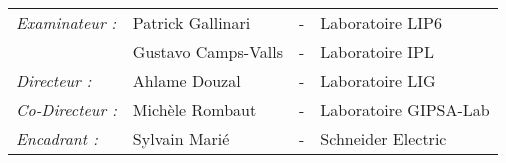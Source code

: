 \begin{titlepage}
\begin{center}
\begin{tabular}{llcl}
      \textit{Examinateur :}	& Patrick Gallinari	& - & Laboratoire LIP6\\
							    & Gustavo Camps-Valls & - & Laboratoire IPL\\
      \textit{Directeur :}	    & Ahlame Douzal & - & Laboratoire LIG\\
      \textit{Co-Directeur :}	& Michèle Rombaut	& - & Laboratoire GIPSA-Lab\\
      \textit{Encadrant :}	    & Sylvain Mari\'{e}	& - & Schneider Electric\\
\end{tabular}
\end{center}
\end{titlepage}
\sloppy

\titlepage

